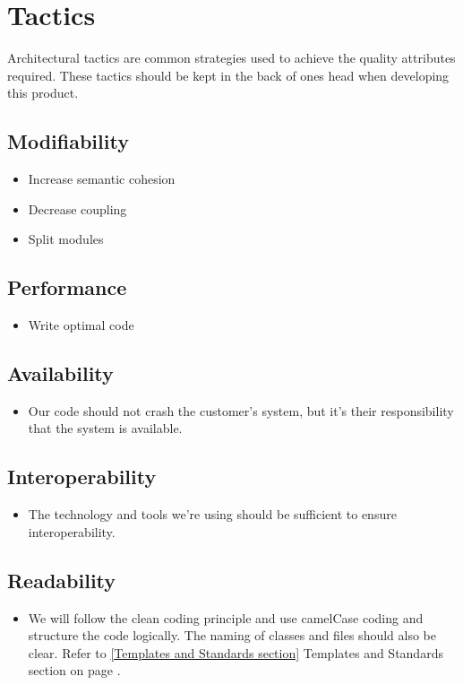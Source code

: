 \section{Tactics}
Architectural tactics are common strategies used to achieve the quality attributes required. These tactics should be kept in the back of ones head when developing this product.
\subsection{Modifiability}
\begin{itemize}
\item Increase semantic cohesion
\item Decrease coupling
\item Split modules
\end{itemize}

\subsection{Performance}
\begin{itemize}
\item Write optimal code
\end{itemize}

\subsection{Availability}
\begin{itemize}
\item Our code should not crash the customer's system, but it's their responsibility that the system is available.
\end{itemize}

\subsection{Interoperability}
\begin{itemize}
\item The technology and tools we're using should be sufficient to ensure interoperability.
\end{itemize}

\subsection{Readability}
\begin{itemize}
\item We will follow the clean coding principle and use camelCase coding and structure the code logically. The naming of classes and files should also be clear. Refer to \ref{Templates and Standards section} Templates and Standards section on page \pageref{Templates and Standards section}.
\end{itemize}

